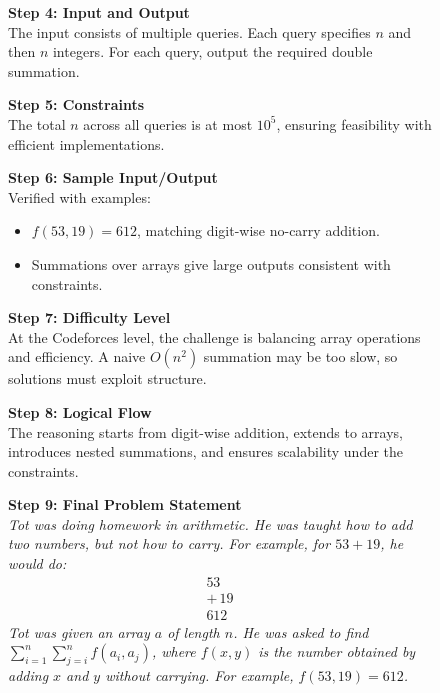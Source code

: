 \begin{figure}[htb]
{\begin{minipage}{0.99\textwidth}
              \vspace{0.5em}
              \noindent\textbf{Step 4: Input and Output} \\
              The input consists of multiple queries. Each query specifies $n$ and then $n$ integers. For each query, output the required double summation.
  
              \vspace{0.5em}
              \noindent\textbf{Step 5: Constraints} \\
              The total $n$ across all queries is at most $10^5$, ensuring feasibility with efficient implementations.
  
              \vspace{0.5em}
              \noindent\textbf{Step 6: Sample Input/Output} \\
              Verified with examples:
              \begin{itemize}
                  \item $f(53,19)=612$, matching digit-wise no-carry addition.
                  \item Summations over arrays give large outputs consistent with constraints.
              \end{itemize}
  
              \vspace{0.5em}
              \noindent\textbf{Step 7: Difficulty Level} \\
              At the Codeforces level, the challenge is balancing array operations and efficiency. A naive $O(n^2)$ summation may be too slow, so solutions must exploit structure.
  
              \vspace{0.5em}
              \noindent\textbf{Step 8: Logical Flow} \\
              The reasoning starts from digit-wise addition, extends to arrays, introduces nested summations, and ensures scalability under the constraints.
  
              \vspace{0.5em}
              \noindent\textbf{Step 9: Final Problem Statement} \\
              \textit{Tot was doing homework in arithmetic. He was taught how to add two numbers, but not how to carry. For example, for $53+19$, he would do:}
              \[
              \begin{array}{r}
              53 \\
              +\,19 \\
              \hline
              612
              \end{array}
              \]
              \textit{Tot was given an array $a$ of length $n$. He was asked to find $\sum_{i=1}^{n}\sum_{j=i}^{n} f(a_i,a_j)$, where $f(x,y)$ is the number obtained by adding $x$ and $y$ without carrying. For example, $f(53,19)=612$.}
  

\end{minipage}}
\end{figure}
